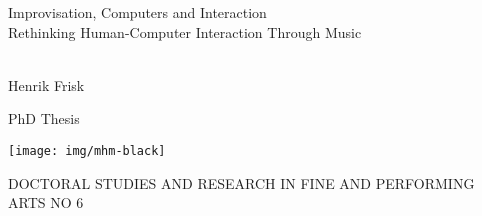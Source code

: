 \begin{titlepage}
  \begin{center}
    {\huge {}Improvisation, Computers and Interaction}\\
{\large {}Rethinking Human-Computer Interaction Through Music}
\\[0.4cm]
\HRule
\\[0.4cm]
\begin{minipage}{0.4\textwidth}
\begin{flushleft}
Henrik Frisk
\end{flushleft}
\end{minipage}
\begin{minipage}{0.4\textwidth}
\begin{flushright}
PhD Thesis
\end{flushright}
\end{minipage}

\vspace{8cm}

\begin{minipage}{0.48\linewidth}
  \texttt{[image: img/mhm-black]}
\end{minipage}
\begin{minipage}{0.5\linewidth}
  \begin{flushright}
  \small {}DOCTORAL STUDIES AND RESEARCH IN FINE
  AND PERFORMING ARTS NO 6
  \end{flushright}
\end{minipage}
\end{center}
\end{titlepage}


